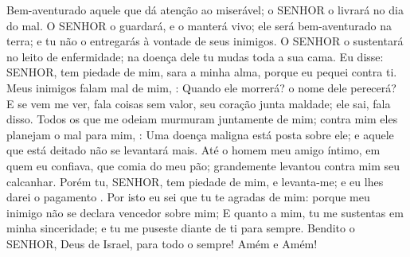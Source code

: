 {\PP 
  Bem-aventurado aquele que dá atenção ao miserável; o SENHOR o livrará no dia do mal.
  O SENHOR o guardará, e o manterá vivo; ele será bem-aventurado na terra; e tu não o entregarás à vontade de seus inimigos.
  O SENHOR o sustentará no leito de enfermidade; na doença dele tu mudas toda a sua cama.
  Eu disse: SENHOR, tem piedade de mim, sara a minha alma, porque eu pequei contra ti.
  Meus inimigos falam mal de mim,
{} : Quando ele morrerá?
{} o nome dele perecerá?
  E se
{} vem me ver, fala coisas sem valor,
{} seu coração junta maldade; ele sai,
{} fala disso.
  Todos os que me odeiam murmuram juntamente de mim; contra mim eles planejam o mal para mim,
{} :
  Uma doença maligna está posta sobre ele; e aquele que está deitado não se levantará mais.
  Até o homem
{} meu amigo íntimo, em quem eu confiava, que comia do meu pão; grandemente levantou contra mim seu calcanhar.
  Porém tu, SENHOR, tem piedade de mim, e levanta-me; e eu lhes darei o pagamento
{} .
  Por isto eu sei que tu te agradas de mim: porque meu inimigo não se declara vencedor sobre mim;
  E quanto a mim, tu me sustentas em minha sinceridade; e tu me puseste diante de ti para sempre.
  Bendito
{} o SENHOR, Deus de Israel, para todo o sempre! Amém e Amém!
\par }


